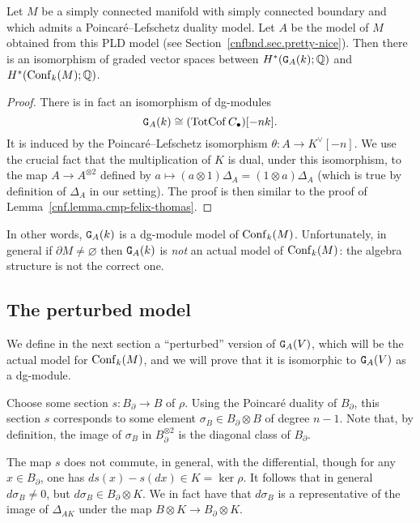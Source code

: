 \begin{theorem}
  \label{cnfbnd.thm.ga-same-cohom}
  Let $M$ be a simply connected manifold with simply connected boundary and which admits a Poincaré--Lefschetz duality model.
  Let $A$ be the model of $M$ obtained from this PLD model (see Section~\ref{cnfbnd.sec.pretty-nice}).
  Then there is an isomorphism of graded vector spaces between $H^{*}(\mathtt{G}_{A}(k); \mathbb{Q})$ and $H^{*}(\operatorname{Conf}_{k}(M); \mathbb{Q})$.
\end{theorem}
\begin{proof}
  There is in fact an isomorphism of dg-modules
  \[ \mathtt{G}_{A}(k) \cong (\operatorname{TotCof} C_{\bullet})[-nk]. \]
  It is induced by the Poincaré--Lefschetz isomorphism $\theta : A \to K^{\vee}[-n]$.
  We use the crucial fact that the multiplication of $K$ is dual, under this isomorphism, to the map $A \to A^{\otimes 2}$ defined by $a \mapsto (a \otimes 1) \Delta_{A} = (1 \otimes a) \Delta_{A}$ (which is true by definition of $\Delta_{A}$ in our setting).
  The proof is then similar to the proof of Lemma~\ref{cnf.lemma.cmp-felix-thomas}.
\end{proof}

In other words, $\mathtt{G}_{A}(k)$ is a dg-module model of $\operatorname{Conf}_{k}(M)$.
Unfortunately, in general if $\partial M \neq \varnothing$ then $\mathtt{G}_{A}(k)$ is \emph{not} an actual model of $\operatorname{Conf}_{k}(M)$: the algebra structure is not the correct one.

\subsection{The perturbed model}
\label{cnfbnd.sec.perturbed-model}

We define in the next section a ``perturbed'' version of $\mathtt{G}_{A}(V)$, which will be the actual model for $\operatorname{Conf}_{k}(M)$, and we will prove that it is isomorphic to $\mathtt{G}_{A}(V)$ as a dg-module.

Choose some section $s : B_{\partial} \to B$ of $\rho$.
Using the Poincaré duality of $B_{\partial}$, this section $s$ corresponds to some element $\sigma_{B} \in B_{\partial} \otimes B$ of degree $n-1$.
Note that, by definition, the image of $\sigma_{B}$ in $B_{\partial}^{\otimes 2}$ is the diagonal class of $B_{\partial}$.

The map $s$ does not commute, in general, with the differential, though for any $x \in B_{\partial}$, one has $ds(x) - s(dx) \in K = \ker \rho$.
It follows that in general $d \sigma_{B} \neq 0$, but $d \sigma_{B} \in B_{\partial} \otimes K$.
We in fact have that $d \sigma_{B}$ is a representative of the image of $\Delta_{AK}$ under the map $B \otimes K \to B_{\partial} \otimes K$.

